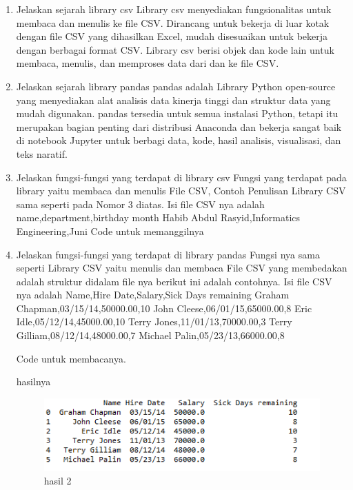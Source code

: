 \begin {enumerate}
\item Jelaskan sejarah library csv\newline 
Library csv menyediakan fungsionalitas untuk membaca dan menulis ke file CSV. Dirancang untuk bekerja di luar kotak dengan file CSV yang dihasilkan Excel, mudah disesuaikan untuk bekerja dengan berbagai format CSV. Library csv berisi objek dan kode lain untuk membaca, menulis, dan memproses data dari dan ke file CSV.
\item Jelaskan sejarah library pandas\newline 
pandas adalah Library Python open-source yang menyediakan alat analisis data kinerja tinggi dan struktur data yang mudah digunakan. pandas tersedia untuk semua instalasi Python, tetapi itu merupakan bagian penting dari distribusi Anaconda dan bekerja sangat baik di notebook Jupyter untuk berbagi data, kode, hasil analisis, visualisasi, dan teks naratif.
\item Jelaskan fungsi-fungsi yang terdapat di library csv\newline
Fungsi yang terdapat pada library yaitu membaca dan menulis File CSV, Contoh Penulisan Library CSV sama seperti pada Nomor 3 diatas.
Isi file CSV nya adalah \newline
name,department,birthday month\newline
Habib Abdul Rasyid,Informatics Engineering,Juni\newline
Code untuk memanggilnya \newline

	\item Jelaskan fungsi-fungsi yang terdapat di library pandas
Fungsi nya sama seperti Library CSV yaitu menulis dan membaca File CSV yang membedakan adalah struktur didalam file nya
berikut ini adalah contohnya.\newline
Isi file CSV nya adalah\newline
Name,Hire Date,Salary,Sick Days remaining\newline
Graham Chapman,03/15/14,50000.00,10\newline
John Cleese,06/01/15,65000.00,8\newline
Eric Idle,05/12/14,45000.00,10\newline
Terry Jones,11/01/13,70000.00,3\newline
Terry Gilliam,08/12/14,48000.00,7\newline
Michael Palin,05/23/13,66000.00,8\newline

Code untuk membacanya.

hasilnya
\begin{figure}[h]
\centering
\includegraphics[scale=0.5]{figures/4/1174002/hasil2.png}
\caption{hasil 2}
\label{fig:csv}
\end{figure}


\end{enumerate}
